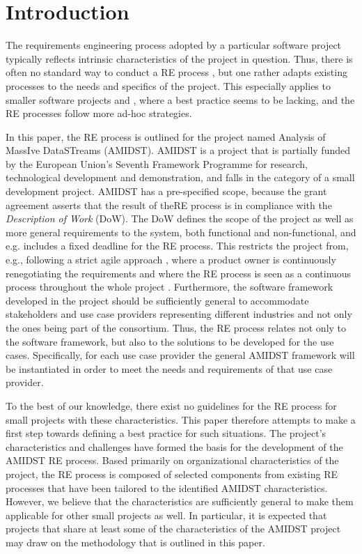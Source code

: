 \section{Introduction}

The requirements engineering process adopted by a particular software project typically reflects intrinsic characteristics of the project in question. Thus, there is often no standard way to conduct a RE process \cite{Poh10},  but one rather adapts existing processes to the needs and specifics of the project. This especially applies to smaller software projects \cite{Qui10} and \cite{Ara07}, where a best practice seems to be lacking, and the RE processes follow more ad-hoc strategies.

In this paper, the RE process is outlined for the project named Analysis of MassIve DataSTreams (AMIDST). AMIDST is a project that is partially funded by the European Union's Seventh Framework Programme for research, technological development and demonstration, and falls in the category of a small development project. AMIDST has a pre-specified scope, because the grant agreement asserts that the result of theRE process is in compliance with the {\em Description of Work} (DoW). The DoW defines the scope of the project as well as more general requirements to the system, both functional and non-functional, and e.g. includes a fixed deadline for the RE process. This restricts the project from, e.g., following a strict agile approach \cite{Din10},  where a product owner is continuously renegotiating the requirements and where the RE process is seen as a continuous process throughout the whole project \cite{Kav11}. Furthermore, the software framework developed in the project should be sufficiently general to accommodate stakeholders and use case providers representing different industries and not only the ones being part of the consortium. Thus, the RE process relates not only to the software framework, but also to the solutions to be developed for the use cases. Specifically, for each use case provider the general AMIDST framework will be instantiated in order to meet the needs and requirements of that use case provider.

To the best of our knowledge, there exist no guidelines for the RE process for small projects with these characteristics. This paper therefore  attempts to make a first step towards defining a best practice for such situations. The project's characteristics and challenges have formed the basis for the development of the AMIDST RE process. Based primarily on organizational characteristics of the project, the RE process is composed of selected components from existing RE processes that have been tailored to the identified AMIDST characteristics. However, we believe that the characteristics are sufficiently general to make them applicable for other small projects as well. In particular, it is expected that projects that share at least some of the characteristics of the AMIDST project may draw on the methodology that is outlined in this paper.

